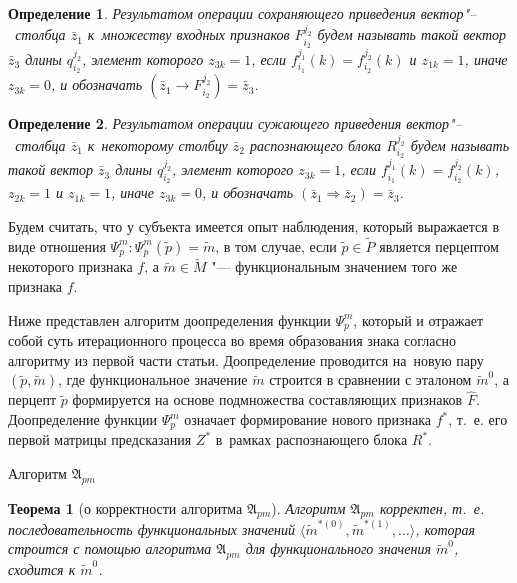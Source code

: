 \documentclass[a4paper, 12pt]{article}
\theoremstyle{plain}
\newtheorem{Theorem}{Теорема}
\newtheorem{Def}{Определение}
\begin{document}
		\begin{Def}
			Результатом операции сохраняющего приведения вектор"--~столбца $\bar z_1$ к~множеству входных признаков $F_{i_2}^{j_2}$ будем называть такой вектор $\bar z_3$ длины $q_{i_2}^{j_2}$, элемент которого $z_{3k}=1$, если $f_{i_1}^{j_1}(k)=f_{i_2}^{j_2}(k)$ и $z_{1k}=1$, иначе $z_{3k}=0$, и обозначать $(\bar z_1\rightarrow F_{i_2}^{j_2})=\bar z_3$.
		\end{Def}
		
		\begin{Def}
			Результатом операции сужающего приведения вектор"--~столбца $\bar z_1$ к~некоторому столбцу $\bar z_2$ распознающего блока $R_{i_2}^{j_2}$ будем называть такой вектор $\bar z_3$ длины $q_{i_2}^{j_2}$, элемент которого $z_{3k}=1$, если $f_{i_1}^{j_1}(k)=f_{i_2}^{j_2}(k)$, $z_{2k}=1$ и $z_{1k}=1$, иначе $z_{3k}=0$, и обозначать $(\bar z_1\Rightarrow \bar z_2)=\bar z_3$.
		\end{Def}
		
		Будем считать, что у субъекта имеется опыт наблюдения, который выражается в виде отношения $\Psi_p^m: \Psi_p^m(\tilde p)=\tilde m$, в том случае, если $\tilde p\in\tilde P$ является перцептом некоторого признака $f$, а $\tilde m\in\tilde M$ "--- функциональным значением того же признака $f$.
		
		Ниже представлен алгоритм доопределения функции $\Psi_p^m$, который и отражает собой суть итерационного процесса во время образования знака согласно алгоритму из первой части статьи. Доопределение проводится на~новую пару $(\tilde p,\tilde m)$, где функциональное значение $\tilde m$ строится в сравнении с эталоном $\tilde m^0$, а перцепт $\tilde p$ формируется на основе подмножества составляющих признаков $\hat F$. Доопределение функции $\Psi_p^m$ означает формирование нового признака $f^*$, т.~е. его первой матрицы предсказания $Z^*$ в~рамках распознающего блока $R^*$.
				
	\begin{algorithm}
		\caption{Алгоритм $\mathfrak{A}_{pm}$}\label{alg:pm}
		\begin{algorithmic}[1]
			
		\end{algorithmic}			
	\end{algorithm}
	
	\begin{Theorem}[о корректности алгоритма $\mathfrak A_{pm}$]
		Алгоритм $\mathfrak A_{pm}$ корректен, т.~е. последовательность функциональных значений $\langle\tilde m^{*(0)},\tilde m^{*(1)},\dots\rangle$, которая строится с помощью алгоритма $\mathfrak A_{pm}$ для функционального значения $\tilde m^0$, сходится к $\tilde m^0$.
	\end{Theorem}
	
\end{document}
